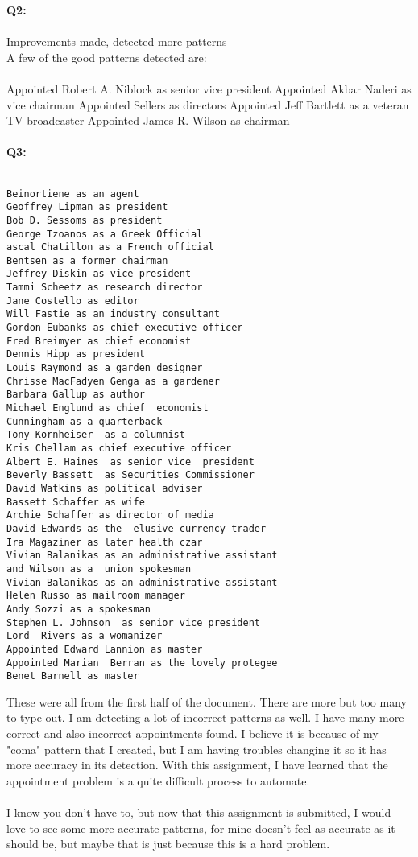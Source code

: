 \documentclass[ruled]{article}
\begin{document}
\textbf{Q2: } \\  \\
Improvements made, detected more patterns\\
A few of the good patterns detected are:
\\ \\ 
Appointed Robert A. Niblock  as senior  vice president
Appointed Akbar Naderi  as vice chairman
Appointed Sellers  as directors
Appointed Jeff Bartlett as a veteran TV broadcaster
Appointed James R. Wilson as chairman
\\ \\
\textbf{Q3: }
\\ \\
\begin{verbatim}
Beinortiene as an agent
Geoffrey Lipman as president
Bob D. Sessoms as president
George Tzoanos as a Greek Official
ascal Chatillon as a French official
Bentsen as a former chairman
Jeffrey Diskin as vice president
Tammi Scheetz as research director
Jane Costello as editor
Will Fastie as an industry consultant
Gordon Eubanks as chief executive officer
Fred Breimyer as chief economist
Dennis Hipp as president
Louis Raymond as a garden designer
Chrisse MacFadyen Genga as a gardener
Barbara Gallup as author
Michael Englund as chief  economist
Cunningham as a quarterback
Tony Kornheiser  as a columnist
Kris Chellam as chief executive officer
Albert E. Haines  as senior vice  president
Beverly Bassett  as Securities Commissioner
David Watkins as political adviser
Bassett Schaffer as wife
Archie Schaffer as director of media
David Edwards as the  elusive currency trader
Ira Magaziner as later health czar
Vivian Balanikas as an administrative assistant
and Wilson as a  union spokesman
Vivian Balanikas as an administrative assistant
Helen Russo as mailroom manager
Andy Sozzi as a spokesman
Stephen L. Johnson  as senior vice president
Lord  Rivers as a womanizer
Appointed Edward Lannion as master
Appointed Marian  Berran as the lovely protegee
Benet Barnell as master
\end{verbatim}

These were all from the first half of the document.  There are more but too many to type out.  I am detecting a lot of incorrect patterns as well.  I have many more correct and also incorrect appointments found.  I believe it is because of my "coma" pattern that I created, but I am having troubles changing it so it has more accuracy in its detection.  With this assignment, I have learned that the appointment problem is a quite difficult process to automate.
\\ \\ 
I know you don't have to, but now that this assignment is submitted, I would love to see some more accurate patterns, for mine doesn't feel as accurate as it should be, but maybe that is just because this is a hard problem.
\end{document}
